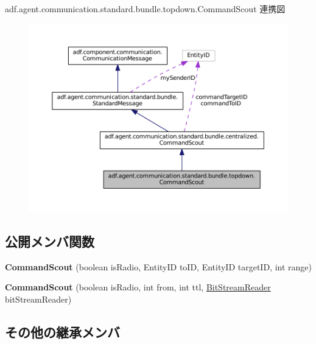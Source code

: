 adf.\+agent.\+communication.\+standard.\+bundle.\+topdown.\+Command\+Scout 連携図
\nopagebreak
\begin{figure}[H]
\begin{center}
\leavevmode
\includegraphics[width=350pt]{classadf_1_1agent_1_1communication_1_1standard_1_1bundle_1_1topdown_1_1CommandScout__coll__graph}
\end{center}
\end{figure}
\subsection*{公開メンバ関数}
\begin{DoxyCompactItemize}
\item 
\hypertarget{classadf_1_1agent_1_1communication_1_1standard_1_1bundle_1_1topdown_1_1CommandScout_ac0a0110b57ef6dbb1974ce6162860868}{}\label{classadf_1_1agent_1_1communication_1_1standard_1_1bundle_1_1topdown_1_1CommandScout_ac0a0110b57ef6dbb1974ce6162860868} 
{\bfseries Command\+Scout} (boolean is\+Radio, Entity\+ID to\+ID, Entity\+ID target\+ID, int range)
\item 
\hypertarget{classadf_1_1agent_1_1communication_1_1standard_1_1bundle_1_1topdown_1_1CommandScout_acdf95a514aa45b155b08d4b250343c9b}{}\label{classadf_1_1agent_1_1communication_1_1standard_1_1bundle_1_1topdown_1_1CommandScout_acdf95a514aa45b155b08d4b250343c9b} 
{\bfseries Command\+Scout} (boolean is\+Radio, int from, int ttl, \hyperlink{classadf_1_1component_1_1communication_1_1util_1_1BitStreamReader}{Bit\+Stream\+Reader} bit\+Stream\+Reader)
\end{DoxyCompactItemize}
\subsection*{その他の継承メンバ}


